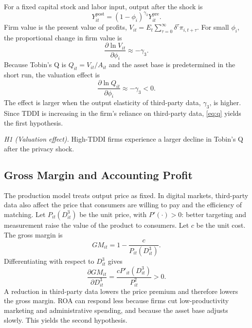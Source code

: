 For a fixed capital stock and labor input, output after the shock is
\begin{equation}
Y^{\text{post}}_{it}=(1-\phi_i)^{\gamma_3}Y^{\text{pre}}_{it}.
\label{eq:outputshock}
\end{equation}
Firm value is the present value of profits, $V_{it}=E_t\sum_{\tau=0}^{\infty}\delta^{\tau}\pi_{i,t+\tau}$. For small $\phi_i$, the proportional change in firm value is
\begin{equation}
\frac{\partial\ln V_{it}}{\partial\phi_i}\approx-\gamma_3.
\label{eq:value}
\end{equation}
Because Tobin's Q is $Q_{it}=V_{it}/A_{it}$ and the asset base is predetermined in the short run, the valuation effect is
\begin{equation}
\frac{\partial\ln Q_{it}}{\partial\phi_i}\approx-\gamma_3<0.
\label{eq:q}
\end{equation}
The effect is larger when the output elasticity of third-party data, $\gamma_3$, is higher. Since TDDI is increasing in the firm's reliance on third-party data, \eqref{eq:q} yields the first hypothesis.

\textit{H1 (Valuation effect).} High-TDDI firms experience a larger decline in Tobin's Q after the privacy shock.

\subsection{Gross Margin and Accounting Profit}

The production model treats output price as fixed. In digital markets, third-party data also affect the price that consumers are willing to pay and the efficiency of matching. Let $P_{it}(D^{3}_{it})$ be the unit price, with $P'(\cdot)>0$: better targeting and measurement raise the value of the product to consumers. Let $c$ be the unit cost. The gross margin is
\begin{equation}
GM_{it}=1-\frac{c}{P_{it}\left(D^{3}_{it}\right)}.
\label{eq:gm}
\end{equation}
Differentiating with respect to $D^{3}_{it}$ gives
\begin{equation}
\frac{\partial GM_{it}}{\partial D^{3}_{it}}=\frac{cP'_{it}\left(D^{3}_{it}\right)}{P_{it}^{2}}>0.
\label{eq:gmderiv}
\end{equation}
A reduction in third-party data lowers the price premium and therefore lowers the gross margin. ROA can respond less because firms cut low-productivity marketing and administrative spending, and because the asset base adjusts slowly. This yields the second hypothesis.

